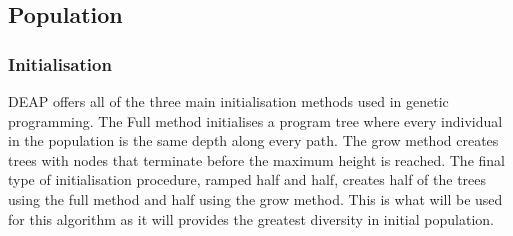 \documentclass[12pt]{article}
\begin{document}
\subsection{Population}
\subsubsection{Initialisation}
DEAP offers all of the three main initialisation methods used in genetic programming. The Full method initialises a program tree where every individual in the population is the same depth along every path. The grow method creates trees with nodes that terminate before the maximum height is reached. The final type of initialisation procedure, ramped half and half, creates half of the trees using the full method and half using the grow method. This is what will be used for this algorithm as it will provides the greatest diversity in initial population.
\end{document}
